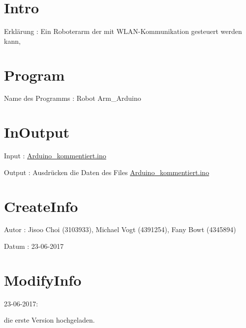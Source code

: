 \hypertarget{index_Intro}{}\section{Intro}\label{index_Intro}

\begin{DoxyItemize}
\item Erklärung \+: Ein Roboterarm der mit W\+L\+A\+N-\/\+Kommunikation gesteuert werden kann, 
\end{DoxyItemize}\hypertarget{index_Program}{}\section{Program}\label{index_Program}

\begin{DoxyItemize}
\item Name des Programms \+: Robot Arm\+\_\+\+Arduino 
\end{DoxyItemize}\hypertarget{index_InOutput}{}\section{In\+Output}\label{index_InOutput}

\begin{DoxyItemize}
\item Input \+: \hyperlink{_arduino__kommentiert_8ino}{Arduino\+\_\+kommentiert.\+ino}
\item Output \+: Ausdrücken die Daten des Files \hyperlink{_arduino__kommentiert_8ino}{Arduino\+\_\+kommentiert.\+ino} 
\end{DoxyItemize}\hypertarget{index_CreateInfo}{}\section{Create\+Info}\label{index_CreateInfo}

\begin{DoxyItemize}
\item Autor \+: Jisoo Choi (3103933), Michael Vogt (4391254), Fany Bowt (4345894)
\begin{DoxyItemize}
\item Datum \+: 23-\/06-\/2017 
\end{DoxyItemize}
\end{DoxyItemize}\hypertarget{index_ModifyInfo}{}\section{Modify\+Info}\label{index_ModifyInfo}

\begin{DoxyItemize}
\item 23-\/06-\/2017\+:
\end{DoxyItemize}
\begin{DoxyEnumerate}
\item die erste Version hochgeladen. 
\end{DoxyEnumerate}